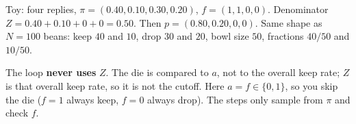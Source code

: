 Toy: four replies, $\pi=(0.40,0.10,0.30,0.20)$, $f=(1,1,0,0)$. Denominator $Z=0.40+0.10+0+0=0.50$. Then $p=(0.80,0.20,0,0)$. Same shape as $N=100$ beans: keep $40$ and $10$, drop $30$ and $20$, bowl size $50$, fractions $40/50$ and $10/50$.

The loop \textbf{never uses} $Z$. The die is compared to $a$, not to the overall keep rate; $Z$ is that overall keep rate, so it is not the cutoff. Here $a=f\in\{0,1\}$, so you skip the die ($f=1$ always keep, $f=0$ always drop). The steps only sample from $\pi$ and check $f$.

